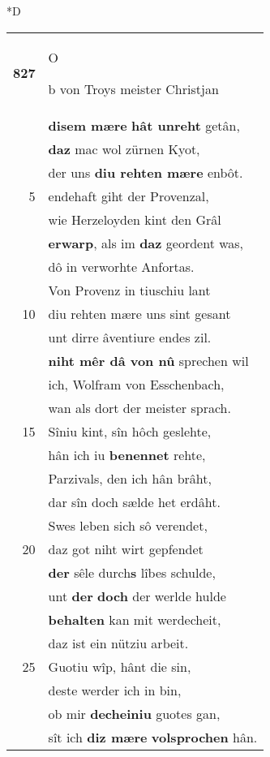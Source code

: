 \documentclass[8pt,a4paper,notitlepage]{article}
\begin{document}
\begin{table}[ht]
\begin{minipage}[t]{0.5\linewidth}
\small
\begin{center}*D
\end{center}
\begin{tabular}{rl}
\textbf{827} & \begin{large}O\end{large}b von Troys meister Christjan\\ 
 & \textbf{disem mære} \textbf{hât unreht} getân,\\ 
 & \textbf{daz} mac wol zürnen Kyot,\\ 
 & der uns \textbf{diu rehten mære} enbôt.\\ 
5 & endehaft giht der Provenzal,\\ 
 & wie Herzeloyden kint den Grâl\\ 
 & \textbf{erwarp}, als im \textbf{daz} geordent was,\\ 
 & dô in verworhte Anfortas.\\ 
 & Von Provenz in tiuschiu lant\\ 
10 & diu rehten mære uns sint gesant\\ 
 & unt dirre âventiure endes zil.\\ 
 & \textbf{niht mêr dâ von nû} sprechen wil\\ 
 & ich, Wolfram von Esschenbach,\\ 
 & wan als dort der meister sprach.\\ 
15 & Sîniu kint, sîn hôch geslehte,\\ 
 & hân ich iu \textbf{benennet} rehte,\\ 
 & Parzivals, den ich hân brâht,\\ 
 & dar sîn doch sælde het erdâht.\\ 
 & Swes leben sich sô verendet,\\ 
20 & daz got niht wirt gepfendet\\ 
 & \textbf{der} sêle durch\textbf{s} lîbes schulde,\\ 
 & unt \textbf{der} \textbf{doch} der werlde hulde\\ 
 & \textbf{behalten} kan mit werdecheit,\\ 
 & daz ist ein nütziu arbeit.\\ 
25 & Guotiu wîp, hânt die sin,\\ 
 & deste werder ich in bin,\\ 
 & ob mir \textbf{decheiniu} guotes gan,\\ 
 & sît ich \textbf{diz mære} \textbf{volsprochen} hân.\\ 

\end{tabular}
\end{minipage}
\end{table}
\end{document}
